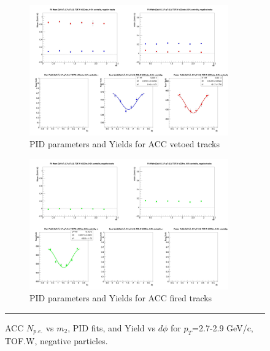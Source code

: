 \begin{figure}[H]
  \ContinuedFloat
  \vspace*{-1cm}
    \begin{subfigure}{1\textwidth}
   \centering
   \includegraphics[width=0.94\textwidth]{hiptfits/neg/fitParams_tof2_cent0_ch0_pT-27-29.jpg}
    \caption{PID parameters and Yields for ACC vetoed tracks}
    \end{subfigure}    
   \begin{subfigure}{1\textwidth}
   \centering
   \includegraphics[width=0.94\textwidth]{hiptfits/neg/fitParams_tof3_cent0_ch0_pT-27-29.jpg}
    \caption{PID parameters and Yields for ACC fired tracks}
    \end{subfigure} 
    \rule{35em}{0.5pt}
  \caption[ACC $N_{p.e.}$ vs $m_2$, PID fits, and Yield vs $d\phi$ for $p_T$=2.7-2.9 GeV/c, TOF.W, negative particles.]{ACC $N_{p.e.}$ vs $m_2$, PID fits, and Yield vs $d\phi$ for $p_T$=2.7-2.9 GeV/c, TOF.W, negative particles.}
  \label{fig:acc27-29neg}
\end{figure}


